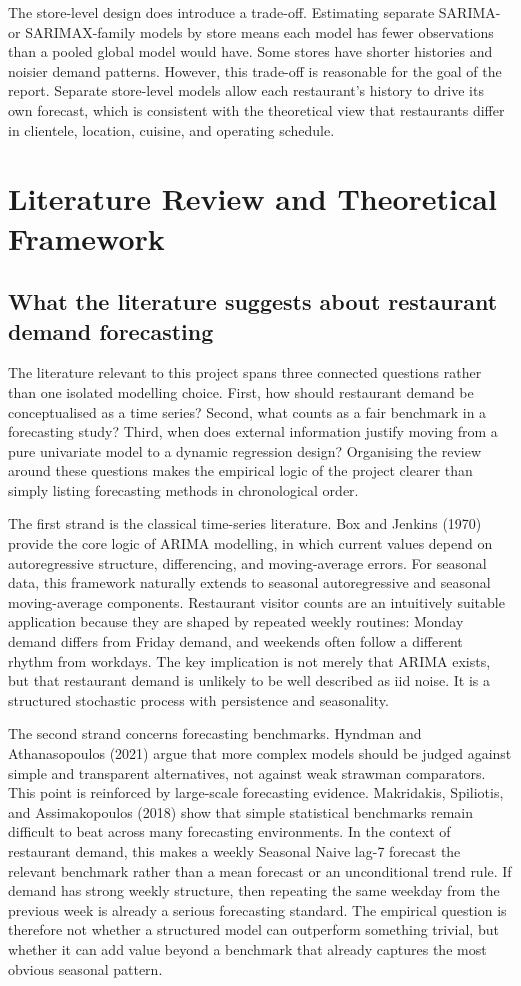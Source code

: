 \documentclass[11pt,oneside]{scrartcl}
\begin{document}
The store-level design does introduce a trade-off. Estimating separate SARIMA- or SARIMAX-family models by store means each model has fewer observations than a pooled global model would have. Some stores have shorter histories and noisier demand patterns. However, this trade-off is reasonable for the goal of the report. Separate store-level models allow each restaurant's history to drive its own forecast, which is consistent with the theoretical view that restaurants differ in clientele, location, cuisine, and operating schedule.

\section{Literature Review and Theoretical Framework}
\subsection{What the literature suggests about restaurant demand forecasting}
The literature relevant to this project spans three connected questions rather than one isolated modelling choice. First, how should restaurant demand be conceptualised as a time series? Second, what counts as a fair benchmark in a forecasting study? Third, when does external information justify moving from a pure univariate model to a dynamic regression design? Organising the review around these questions makes the empirical logic of the project clearer than simply listing forecasting methods in chronological order.

The first strand is the classical time-series literature. Box and Jenkins (1970) provide the core logic of ARIMA modelling, in which current values depend on autoregressive structure, differencing, and moving-average errors. For seasonal data, this framework naturally extends to seasonal autoregressive and seasonal moving-average components. Restaurant visitor counts are an intuitively suitable application because they are shaped by repeated weekly routines: Monday demand differs from Friday demand, and weekends often follow a different rhythm from workdays. The key implication is not merely that ARIMA exists, but that restaurant demand is unlikely to be well described as iid noise. It is a structured stochastic process with persistence and seasonality.

The second strand concerns forecasting benchmarks. Hyndman and Athanasopoulos (2021) argue that more complex models should be judged against simple and transparent alternatives, not against weak strawman comparators. This point is reinforced by large-scale forecasting evidence. Makridakis, Spiliotis, and Assimakopoulos (2018) show that simple statistical benchmarks remain difficult to beat across many forecasting environments. In the context of restaurant demand, this makes a weekly Seasonal Naive lag-7 forecast the relevant benchmark rather than a mean forecast or an unconditional trend rule. If demand has strong weekly structure, then repeating the same weekday from the previous week is already a serious forecasting standard. The empirical question is therefore not whether a structured model can outperform something trivial, but whether it can add value beyond a benchmark that already captures the most obvious seasonal pattern.
\end{document}
